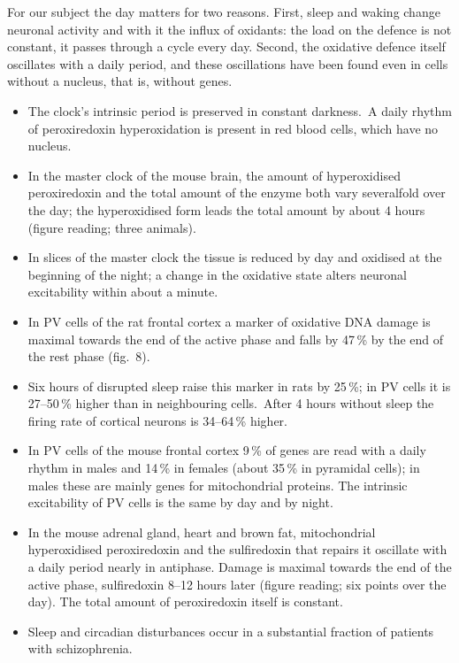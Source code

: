 For our subject the day matters for two reasons. First, sleep and waking change neuronal activity and with it the influx of oxidants: the load on the defence is not constant, it passes through a cycle every day. Second, the oxidative defence itself oscillates with a daily period, and these oscillations have been found even in cells without a nucleus, that is, without genes.
\facts
\begin{itemize}
\item The clock's intrinsic period is preserved in constant darkness.\tU\ A daily rhythm of peroxiredoxin hyperoxidation is present in red blood cells, which have no nucleus.\tU
\item In the master clock of the mouse brain, the amount of hyperoxidised peroxiredoxin and the total amount of the enzyme both vary severalfold over the day; the hyperoxidised form leads the total amount by about 4 hours (figure reading; three animals).\tS
\item In slices of the master clock the tissue is reduced by day and oxidised at the beginning of the night; a change in the oxidative state alters neuronal excitability within about a minute.\tS
\item In PV cells of the rat frontal cortex a marker of oxidative DNA damage is maximal towards the end of the active phase and falls by 47\,\% by the end of the rest phase (fig.~8).\tP
\item Six hours of disrupted sleep raise this marker in rats by 25\,\%; in PV cells it is 27--50\,\% higher than in neighbouring cells.\tS\ After 4 hours without sleep the firing rate of cortical neurons is 34--64\,\% higher.\tS
\item In PV cells of the mouse frontal cortex 9\,\% of genes are read with a daily rhythm in males and 14\,\% in females (about 35\,\% in pyramidal cells); in males these are mainly genes for mitochondrial proteins. The intrinsic excitability of PV cells is the same by day and by night.\tP
\item In the mouse adrenal gland, heart and brown fat, mitochondrial hyperoxidised peroxiredoxin and the sulfiredoxin that repairs it oscillate with a daily period nearly in antiphase. Damage is maximal towards the end of the active phase, sulfiredoxin 8--12 hours later (figure reading; six points over the day). The total amount of peroxiredoxin itself is constant.\tS
\item Sleep and circadian disturbances occur in a substantial fraction of patients with schizophrenia.\tU
\end{itemize}
